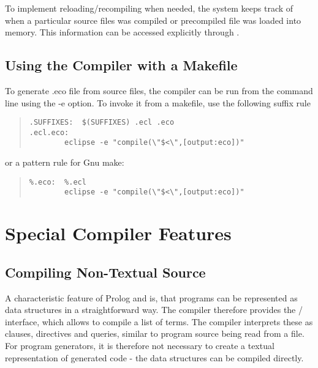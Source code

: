 To implement reloading/recompiling when needed, the system keeps track of
when a particular source files was compiled or precompiled file was loaded
into memory.  This information can be accessed explicitly through
.



\subsection{Using the Compiler with a Makefile}

To generate .eco file from source files, the compiler can be run from the
command line using the -e option.
To invoke it from a makefile, use the following suffix rule
\begin{quote}\begin{verbatim}
.SUFFIXES:  $(SUFFIXES) .ecl .eco
.ecl.eco:
        eclipse -e "compile(\"$<\",[output:eco])"
\end{verbatim}
\end{quote}
or a pattern rule for Gnu make:
\begin{quote}\begin{verbatim}
%.eco:  %.ecl
        eclipse -e "compile(\"$<\",[output:eco])"
\end{verbatim}
\end{quote}



\section{Special Compiler Features}

\subsection{Compiling Non-Textual Source}
A characteristic feature of Prolog and {\eclipse} is, that programs can
be represented as data structures in a straightforward way.
The compiler therefore provides the
/
interface, which allows to compile a list of terms.  The compiler
interprets these as clauses, directives and queries, similar to program
source being read from a file.  For program generators, it is therefore
not necessary to create a textual representation of generated code -
the data structures can be compiled directly.

